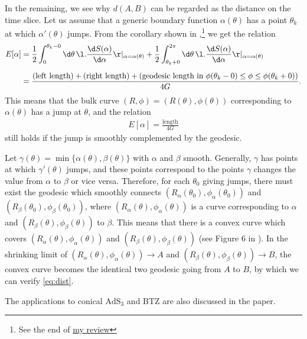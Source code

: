 \documentclass[12pt]{article}
\begin{document}
In the remaining, we see why $d(A,B)$ can be regarded as the distance on the time slice.
Let us assume that a generic boundary function $\alpha(\theta)$ has a point $\theta_k$ at which $\alpha'(\theta)$ jumps.
From the corollary shown in \cite{Balasubramanian:2013lsa},\footnote{
See the end of \href{https://albertmcc.github.io/reviews/Hole_ographic_spacetime.pdf}{\color{blue}my review}}
we get the relation
\begin{align}
	E[\alpha] &= \frac{1}{2}\int_{0}^{\theta_k-0}\d\theta\,\l.\frac{\d S(\alpha)}{\d \alpha}\r|_{\alpha = \alpha(\theta)} + \frac{1}{2}\int_{\theta_k+0}^{2\pi}\d\theta\,\l.\frac{\d S(\alpha)}{\d \alpha}\r|_{\alpha = \alpha(\theta)}\nonumber\\[2mm]
	&= \frac{(\mbox{left length}) + (\mbox{right length}) + (\mbox{geodesic length in } \phi(\theta_k-0)\leq \phi\leq \phi(\theta_k+0))}{4G}.
\end{align}
This means that the bulk curve $(R,\phi) = (R(\theta),\phi(\theta))$ corresponding to $\alpha(\theta)$ has a jump at $\theta$, and the relation
\begin{align}
	E[\alpha] = \frac{\mbox{length}}{4G}
\end{align}
still holds if the jump is smoothly complemented by the geodesic.

Let $\gamma(\theta) = \min\{\alpha(\theta),\beta(\theta)\}$ with $\alpha$ and $\beta$ smooth.
Generally, $\gamma$ has points at which $\gamma'(\theta)$ jumps, and these points correspond to the points $\gamma$ changes the value from $\alpha$ to $\beta$ or vice versa.
Therefore, for each $\theta_0$ giving jumps, there must exist the geodesic which smoothly connects $(R_\alpha(\theta_0),\phi_\alpha(\theta_0))$ and $(R_\beta(\theta_0),\phi_\beta(\theta_0))$, where $(R_\alpha(\theta),\phi_\alpha(\theta))$ is a curve corresponding to $\alpha$ and $(R_\beta(\theta),\phi_\beta(\theta))$ to $\beta$.
This means that there is a convex curve which covers $(R_\alpha(\theta),\phi_\alpha(\theta))$ and $(R_\beta(\theta),\phi_\beta(\theta))$ (see Figure 6 in \cite{Czech:2014ppa}).
In the shrinking limit of $(R_\alpha(\theta),\phi_\alpha(\theta))\to A$ and $(R_\beta(\theta),\phi_\beta(\theta))\to B$, the convex curve becomes the identical two geodesic going from $A$ to $B$, by which we can verify \eqref{eq:dist}.

The applications to conical $\mathrm{AdS}_3$ and BTZ are also discussed in the paper.












 

\end{document}
